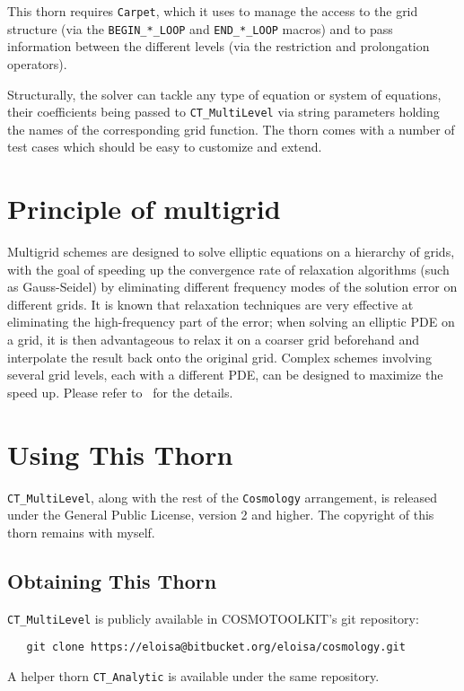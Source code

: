 This thorn requires \texttt{Carpet}, which it uses to manage the 
access to the grid structure (via the \texttt{BEGIN\_*\_LOOP} and 
\texttt{END\_*\_LOOP} macros) and to pass information between the 
different levels (via the restriction and prolongation operators).

Structurally, the solver can tackle any type of equation or system
of equations, their coefficients being passed to \texttt{CT\_MultiLevel} 
via string parameters holding the names of the corresponding grid 
function. The thorn comes with a number of test cases which should 
be easy to customize and extend.

\section{Principle of multigrid}
Multigrid schemes are designed to solve elliptic equations on a 
hierarchy of grids, with the goal of speeding up the convergence 
rate of relaxation algorithms (such as Gauss-Seidel) by eliminating
different frequency modes of the solution error on different grids.
It is known that relaxation techniques are very effective at 
eliminating the high-frequency part of the error; when solving an 
elliptic PDE on a grid, it is then advantageous to relax it on a 
coarser grid beforehand and interpolate the result back onto the
original grid. Complex schemes involving several grid levels, each
with a different PDE, can be designed to maximize the speed up.
Please refer to~\cite{Briggs:2000fk} for the details.

\section{Using This Thorn}
\texttt{CT\_MultiLevel}, along with the rest of the \texttt{Cosmology}
arrangement, is released under the General Public License, version 2
and higher. The copyright of this thorn remains with myself.

\subsection{Obtaining This Thorn}
\texttt{CT\_MultiLevel} is publicly available in COSMOTOOLKIT's git 
repository:
\begin{verbatim}
   git clone https://eloisa@bitbucket.org/eloisa/cosmology.git
\end{verbatim}
A helper thorn \texttt{CT\_Analytic} is available under the same repository.

